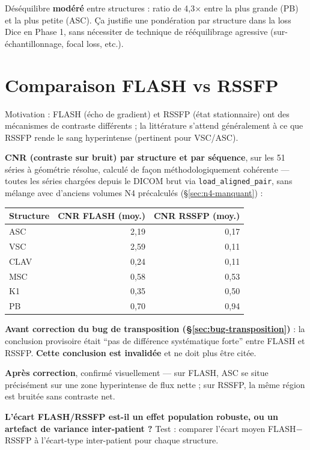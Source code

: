 Déséquilibre \textbf{modéré} entre structures : ratio de 4,3$\times$ entre la plus grande (PB) et la
plus petite (ASC). Ça justifie une pondération par structure dans la loss Dice en Phase 1, sans
nécessiter de technique de rééquilibrage agressive (sur-échantillonnage, focal loss, etc.).

\section{Comparaison FLASH vs RSSFP}
\label{sec:flash-vs-rssfp}

Motivation : FLASH (écho de gradient) et RSSFP (état stationnaire) ont des mécanismes de contraste
différents ; la littérature s'attend généralement à ce que RSSFP rende le sang hyperintense (pertinent
pour VSC/ASC).

\textbf{CNR (contraste sur bruit) par structure et par séquence}, sur les 51 séries à géométrie
résolue, calculé de façon méthodologiquement cohérente --- toutes les séries chargées depuis le DICOM
brut via \texttt{load\_aligned\_pair}, sans mélange avec d'anciens volumes N4 précalculés
(\S\ref{sec:n4-manquant}) :

\begin{center}
\begin{tabular}{lrr}
\toprule
Structure & CNR FLASH (moy.) & CNR RSSFP (moy.) \\
\midrule
ASC  & 2,19 & 0,17 \\
VSC  & 2,59 & 0,11 \\
CLAV & 0,24 & 0,11 \\
MSC  & 0,58 & 0,53 \\
K1   & 0,35 & 0,50 \\
PB   & 0,70 & 0,94 \\
\bottomrule
\end{tabular}
\end{center}

\textbf{Avant correction du bug de transposition (\S\ref{sec:bug-transposition})} : la conclusion
provisoire était ``pas de différence systématique forte'' entre FLASH et RSSFP. \textbf{Cette
conclusion est invalidée} et ne doit plus être citée.

\textbf{Après correction}, confirmé visuellement --- sur FLASH, ASC se situe précisément sur une zone
hyperintense de flux nette ; sur RSSFP, la même région est bruitée sans contraste net.

\textbf{L'écart FLASH/RSSFP est-il un effet population robuste, ou un artefact de variance
inter-patient ?} Test : comparer l'écart moyen FLASH$-$RSSFP à l'écart-type inter-patient pour chaque
structure.

